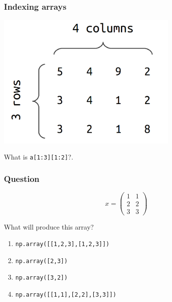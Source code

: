 \documentclass[11pt]{beamer}
\begin{document}
\begin{frame}[fragile]
  \frametitle{Indexing arrays}
  \Enlarge

  \includegraphics[width=0.67\textwidth]{./img/ndarray.png}

  \begin{enumerate}
  \myitem  What is \texttt{a[1:3][1:2]}?.
  \end{enumerate}
\end{frame}

\begin{frame}[fragile]
  \frametitle{Question}
  \Enlarge

$$
x =
\left(
\begin{array}{cc}
1 & 1 \\
2 & 2 \\
3 & 3
\end{array}
\right)
$$

  What will produce this array?

  \begin{enumerate}[label=\Alph*]
  \item
  \begin{Verbatim}
np.array([[1,2,3],[1,2,3]])
  \end{Verbatim}
  \item
  \begin{Verbatim}
np.array([2,3])
  \end{Verbatim}
  \item
  \begin{Verbatim}
np.array([3,2])
  \end{Verbatim}
  \item
  \begin{Verbatim}
np.array([[1,1],[2,2],[3,3]])
  \end{Verbatim}
  \end{enumerate}
\end{frame}
\end{document}

